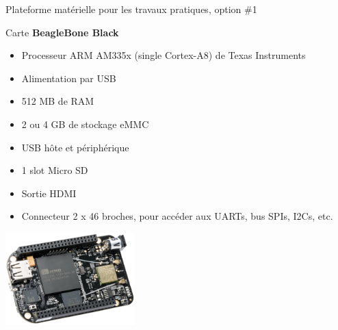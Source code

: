 \documentclass[a4paper,12pt,obeyspaces,spaces,hyphens]{article}
\begin{document}
\feshowtitle

\certificate{}
\disabilities{}

\feagendatwocolumn
{Plateforme matérielle pour les travaux pratiques, option \#1}
{
  Carte {\bf BeagleBone Black}
  \begin{itemize}
  \item Processeur ARM AM335x (single Cortex-A8) de Texas Instruments
  \item Alimentation par USB
  \item 512 MB de RAM
  \item 2 ou 4 GB de stockage eMMC
  \item USB hôte et périphérique
  \item 1 slot Micro SD
  \item Sortie HDMI
  \item Connecteur 2 x 46 broches, pour accéder aux UARTs, bus SPIs, I2Cs, etc.
  \end{itemize}
}
{}
{
  \begin{center}
    \includegraphics[width=5cm]{../slides/beagleboneblack-board/beagleboneblack.png}
  \end{center}
}
\end{document}
